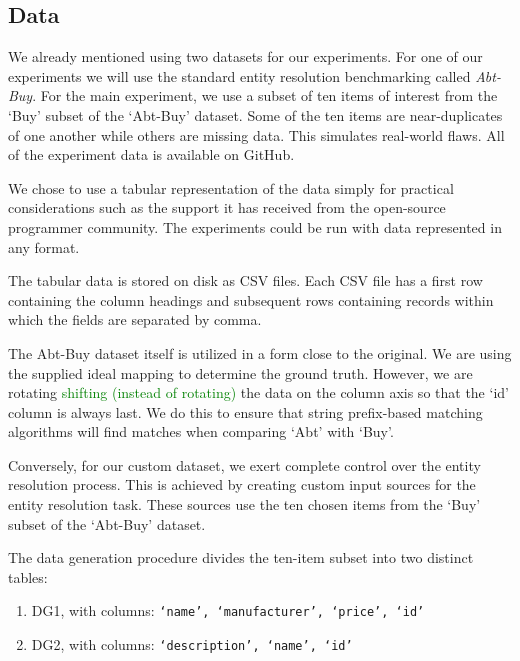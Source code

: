 \documentclass[11pt]{article}
\begin{document}
    \subsection{Data}

    We already mentioned using two datasets for our experiments.
    For one of our experiments we will use the standard entity resolution
    benchmarking called \textit{Abt-Buy}\cite{vldb2010}.
    For the main experiment, we use a subset of ten items of interest from the
    `Buy' subset of the `Abt-Buy' dataset.
    Some of the ten items are near-duplicates of one another while others are
    missing data.
    This simulates real-world flaws.
    All of the experiment data is available on GitHub\cite{expdata2023}.
    
    We chose to use a tabular representation of the data simply for practical
    considerations such as the support it has received from the open-source
    programmer community\cite{pandas2010,pandas2023}.
    The experiments could be run with data represented in any format.
    
    The tabular data is stored on disk as CSV files.
    Each CSV file has a first row containing the column headings and subsequent
    rows containing records within which the fields are separated by comma.

    The Abt-Buy dataset itself is utilized in a form close to the original.
    We are using the supplied ideal mapping to determine the ground truth.
    However, we are rotating 
    \textcolor{green}{shifting (instead of rotating)} 
    the data on the column axis so that the `id' column
    is always last.
    We do this to ensure that string prefix-based matching algorithms will find
    matches when comparing `Abt' with `Buy'.

    Conversely, for our custom dataset, we exert complete control over the
    entity resolution process.
    This is achieved by creating custom input sources for the entity resolution
    task.
    These sources use the ten chosen items from the `Buy' subset of the
    `Abt-Buy' dataset.

    The data generation procedure divides the ten-item subset into two distinct
    tables:

    \begin{enumerate}[label=\textbullet,leftmargin=1cm]
    \item DG1, with columns: \texttt{`name', `manufacturer', `price', `id'}
    \item DG2, with columns: \texttt{`description', `name', `id'}
    \end{enumerate}
\end{document}
